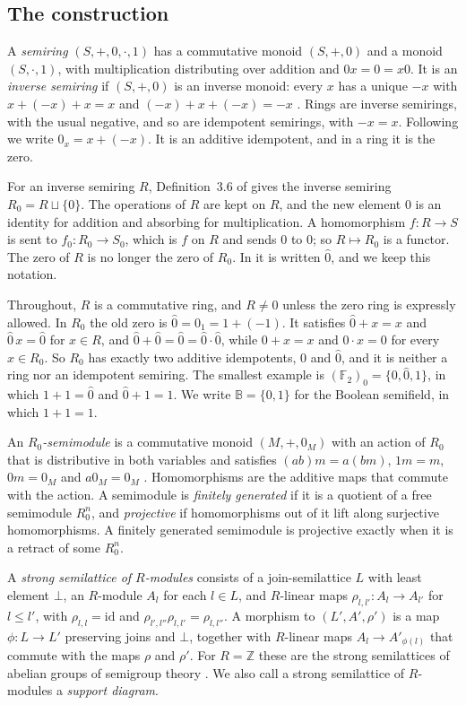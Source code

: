 \documentclass[11pt]{amsart}
\theoremstyle{remark}
\newcommand{\B}{\mathbb B}
\newcommand{\oz}{\widehat{0}}
\begin{document}
\subsection{The construction}
A \emph{semiring} $(S,+,0,\cdot,1)$ has a commutative monoid $(S,+,0)$ and a monoid $(S,\cdot,1)$, with multiplication distributing over addition and $0x=0=x0$. It is an \emph{inverse semiring} if $(S,+,0)$ is an inverse monoid: every $x$ has a unique $-x$ with $x+(-x)+x=x$ and $(-x)+x+(-x)=-x$ \cite[\S1]{FGJM}. Rings are inverse semirings, with the usual negative, and so are idempotent semirings, with $-x=x$. Following \cite{FGJM} we write $0_x=x+(-x)$. It is an additive idempotent, and in a ring it is the zero.

For an inverse semiring $R$, Definition~3.6 of \cite{FGJM} gives the inverse semiring $R_0=R\sqcup\{0\}$. The operations of $R$ are kept on $R$, and the new element $0$ is an identity for addition and absorbing for multiplication. A homomorphism $f\colon R\to S$ is sent to $f_0\colon R_0\to S_0$, which is $f$ on $R$ and sends $0$ to $0$; so $R\mapsto R_0$ is a functor. The zero of $R$ is no longer the zero of $R_0$. In \cite{FGJM} it is written $\oz$, and we keep this notation.

Throughout, $R$ is a commutative ring, and $R\ne0$ unless the zero ring is expressly allowed. In $R_0$ the old zero is $\oz=0_1=1+(-1)$. It satisfies $\oz+x=x$ and $\oz\,x=\oz$ for $x\in R$, and $\oz+\oz=\oz=\oz\cdot\oz$, while $0+x=x$ and $0\cdot x=0$ for every $x\in R_0$. So $R_0$ has exactly two additive idempotents, $0$ and $\oz$, and it is neither a ring nor an idempotent semiring. The smallest example is $(\mathbb F_2)_0=\{0,\oz,1\}$, in which $1+1=\oz$ and $\oz+1=1$. We write $\B=\{0,1\}$ for the Boolean semifield, in which $1+1=1$.

An \emph{$R_0$-semimodule} is a commutative monoid $(M,+,0_M)$ with an action of $R_0$ that is distributive in both variables and satisfies $(ab)m=a(bm)$, $1m=m$, $0m=0_M$ and $a0_M=0_M$ \cite[Definition 2.13]{FGJM}. Homomorphisms are the additive maps that commute with the action. A semimodule is \emph{finitely generated} if it is a quotient of a free semimodule $R_0^n$, and \emph{projective} if homomorphisms out of it lift along surjective homomorphisms. A finitely generated semimodule is projective exactly when it is a retract of some $R_0^n$.

A \emph{strong semilattice of $R$-modules} consists of a join-semilattice $L$ with least element $\bot$, an $R$-module $A_l$ for each $l\in L$, and $R$-linear maps $\rho_{l,l'}\colon A_l\to A_{l'}$ for $l\le l'$, with $\rho_{l,l}=\mathrm{id}$ and $\rho_{l',l''}\rho_{l,l'}=\rho_{l,l''}$. A morphism to $(L',A',\rho')$ is a map $\phi\colon L\to L'$ preserving joins and $\bot$, together with $R$-linear maps $A_l\to A'_{\phi(l)}$ that commute with the maps $\rho$ and $\rho'$. For $R=\mathbb Z$ these are the strong semilattices of abelian groups of semigroup theory \cite[Ch.~4]{Howie}. We also call a strong semilattice of $R$-modules a \emph{support diagram}.
\end{document}
